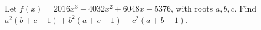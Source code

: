 Let $f(x)=2016x^3-4032x^2+6048x-5376$, with roots $a,b,c$. Find $a^2(b+c-1)+b^2(a+c-1)+c^2(a+b-1)$.
